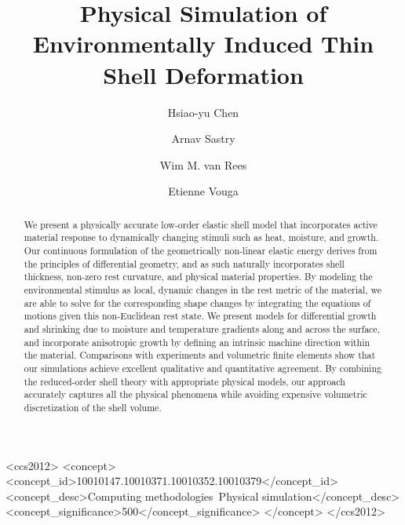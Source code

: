 \documentclass[timestamp,acmtog]{acmart}
\begin{document}
\title{Physical Simulation of Environmentally Induced Thin Shell Deformation}

\author{Hsiao-yu Chen}

  \author{Arnav Sastry}
  
  \author{Wim M. van Rees}

\author{Etienne Vouga}


\begin{abstract}
We present a physically accurate low-order elastic shell model that incorporates active material response to dynamically changing stimuli such as heat, moisture, and growth. Our continuous formulation of the geometrically non-linear elastic energy derives from the principles of differential geometry, and as such naturally incorporates shell thickness, non-zero rest curvature, and physical material properties. By modeling the environmental stimulus as local, dynamic changes in the rest metric of the material, we are able to solve for the corresponding shape changes by integrating the equations of motions given this non-Euclidean rest state. We present models for differential growth and shrinking due to moisture and temperature gradients along and across the surface, and incorporate anisotropic growth by defining an intrinsic machine direction within the material. Comparisons with experiments and volumetric finite elements show that our simulations achieve excellent qualitative and quantitative agreement. By combining the reduced-order shell theory with appropriate physical models, our approach accurately captures all the physical phenomena while avoiding expensive volumetric discretization of the shell volume. 
\end{abstract}


\begin{CCSXML}
<ccs2012>
<concept>
<concept_id>10010147.10010371.10010352.10010379</concept_id>
<concept_desc>Computing methodologies~Physical simulation</concept_desc>
<concept_significance>500</concept_significance>
</concept>
</ccs2012>
\end{CCSXML}
\end{document}

